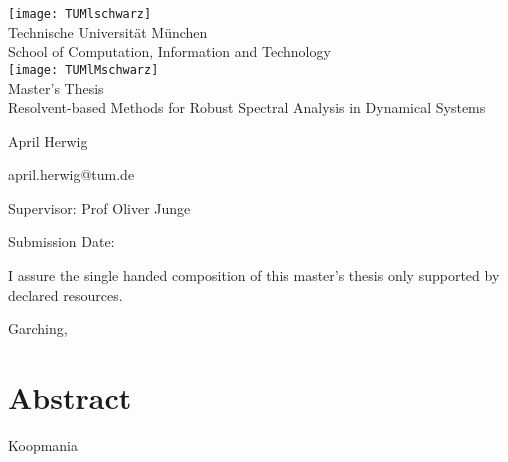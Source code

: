 \pagestyle{empty}
\begin{titlepage}
\begin{center}
\texttt{[image: TUMlschwarz]}\\[3mm]
\sf
{\Large
  Technische Universit\"at M\"unchen\\[5mm]
  School of Computation, Information and Technology\\[8mm]
}
\normalsize
\texttt{[image: TUMlMschwarz]}\\[15mm]

Master's Thesis\\[15mm]

{\LARGE
  Resolvent-based Methods for Robust Spectral Analysis in Dynamical Systems
}
\bigskip

\normalsize

April Herwig

april.herwig@tum.de
\end{center}
\vspace*{75mm}

Supervisor: Prof Oliver Junge
\medskip

Submission Date:  %

\end{titlepage}

\vspace*{150mm}

I assure the single handed composition of this master's thesis only supported by declared resources.
\bigskip

Garching, %
\newpage

\section*{Abstract}

Koopmania
